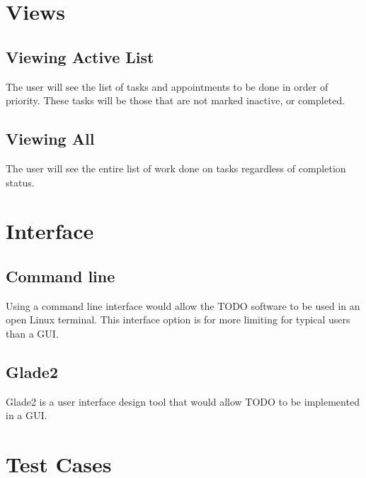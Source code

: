 \documentclass[12pt]{article}
\begin{document}
\section{Views}
\subsection{Viewing Active List}
The user will see the list of tasks and appointments to be done in order of priority. These tasks will be those that are not marked inactive, or completed.

\subsection{Viewing All} \label{sec:View all}
The user will see the entire list of work done on tasks regardless of completion status.

\section{Interface}
\subsection{Command line}
Using a command line interface would allow the TODO software to be used in an open Linux terminal. This interface option is for more limiting for typical users than a GUI.

\subsection{Glade2}
Glade2 is a user interface design tool that would allow TODO to be implemented in a GUI.  


\section{Test Cases}


\end{document}
